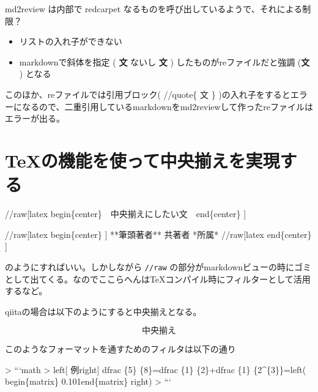 md2review は内部で redcarpet なるものを呼び出しているようで、それによる制限？

\begin{itemize}
\item リストの入れ子ができない
\item markdownで斜体を指定 ( \textbf{文} ないし \textbf{文} ) したものがreファイルだと強調 (\textbf{文} ) となる
\end{itemize}

このほか、reファイルでは引用ブロック( //quote\{ 文 \} )の入れ子をするとエラーになるので、二重引用しているmarkdownをmd2reviewして作ったreファイルはエラーが出る。

\section{TeXの機能を使って中央揃えを実現する}
\label{sec:4-4}

\begin{reviewemlist}
//raw[\textbar{}latex\textbar{} \reviewbackslash{}begin\{center\}　中央揃えにしたい文　\reviewbackslash{}end\{center\} ]
\end{reviewemlist}

\begin{reviewemlist}
//raw[\textbar{}latex\textbar{} \reviewbackslash{}begin\{center\} ]
**筆頭著者** 共著者 *所属*
//raw[\textbar{}latex\textbar{} \reviewbackslash{}end\{center\} ]
\end{reviewemlist}

のようにすればいい。しかしながら
\texttt{//raw} の部分がmarkdownビューの時にゴミとして出てくる。なのでここらへんはTeXコンパイル時にフィルターとして活用するなど。

qiitaの場合は以下のようにすると中央揃えとなる。

\begin{equation*}
中央揃え
\end{equation*}

このようなフォーマットを通すためのフィルタは以下の通り

\begin{reviewemlist}
\textgreater{} ```math
\textgreater{} \reviewbackslash{}left[ 例\reviewbackslash{}right] \reviewbackslash{}dfrac \{5\} \{8\}=\reviewbackslash{}dfrac \{1\} \{2\}+\reviewbackslash{}dfrac \{1\}   \{2\textasciicircum{}\{3\}\}=\reviewbackslash{}left( \reviewbackslash{}begin\{matrix\} 0.101\reviewbackslash{}end\{matrix\} \reviewbackslash{}right)
\textgreater{} ```
\end{reviewemlist}


